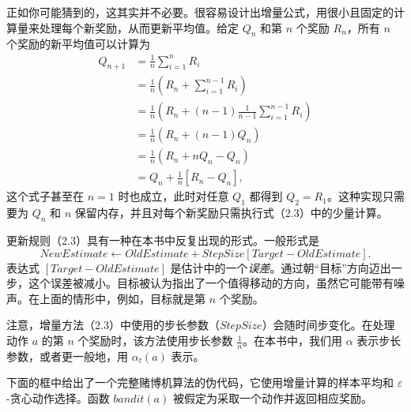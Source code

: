 \documentclass[UTF8, 12pt, fontset=fandol, oneside]{ctexart}
\begin{document}
正如你可能猜到的，这其实并不必要。很容易设计出增量公式，用很小且固定的计算量来处理每个新奖励，从而更新平均值。给定 $Q_n$ 和第 $n$ 个奖励 $R_n$，所有 $n$ 个奖励的新平均值可以计算为
\begin{equation}
\begin{aligned}
Q_{n+1}
&= \frac{1}{n}\sum_{i=1}^{n}R_i\\
&= \frac{1}{n}\left(R_n+\sum_{i=1}^{n-1}R_i\right)\\
&= \frac{1}{n}\left(R_n+(n-1)\frac{1}{n-1}\sum_{i=1}^{n-1}R_i\right)\\
&= \frac{1}{n}\left(R_n+(n-1)Q_n\right)\\
&= \frac{1}{n}\left(R_n+nQ_n-Q_n\right)\\
&= Q_n+\frac{1}{n}\left[R_n-Q_n\right],
\end{aligned}
\tag{2.3}
\end{equation}
这个式子甚至在 $n=1$ 时也成立，此时对任意 $Q_1$ 都得到 $Q_2=R_1$。这种实现只需要为 $Q_n$ 和 $n$ 保留内存，并且对每个新奖励只需执行式（2.3）中的少量计算。

更新规则（2.3）具有一种在本书中反复出现的形式。一般形式是
\begin{equation}
\mathit{NewEstimate}\leftarrow \mathit{OldEstimate}
+\mathit{StepSize}\left[\mathit{Target}-\mathit{OldEstimate}\right].
\tag{2.4}
\end{equation}
表达式 $\left[\mathit{Target}-\mathit{OldEstimate}\right]$ 是估计中的一个\emph{误差}。通过朝“目标”方向迈出一步，这个误差被减小。目标被认为指出了一个值得移动的方向，虽然它可能带有噪声。在上面的情形中，例如，目标就是第 $n$ 个奖励。

注意，增量方法（2.3）中使用的步长参数（$\mathit{StepSize}$）会随时间步变化。在处理动作 $a$ 的第 $n$ 个奖励时，该方法使用步长参数 $\frac{1}{n}$。在本书中，我们用 $\alpha$ 表示步长参数，或者更一般地，用 $\alpha_t(a)$ 表示。

下面的框中给出了一个完整赌博机算法的伪代码，它使用增量计算的样本平均和 $\varepsilon$-贪心动作选择。函数 $\mathit{bandit}(a)$ 被假定为采取一个动作并返回相应奖励。

\begin{center}
\end{center}
\end{document}

